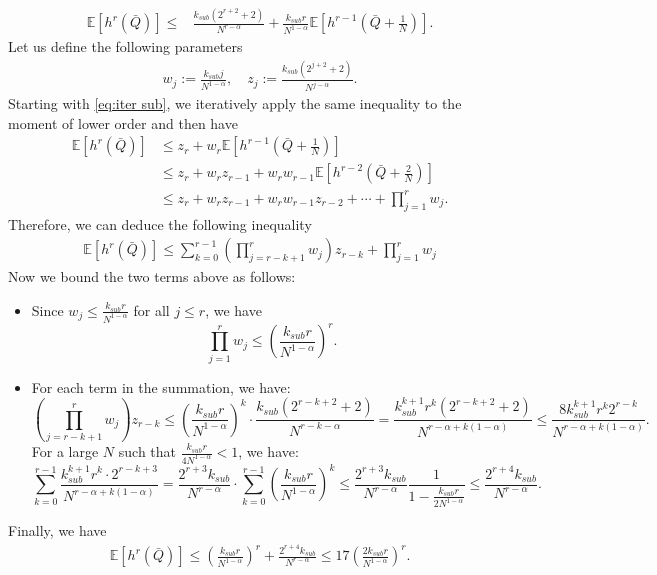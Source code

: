 \documentclass[11pt,oneside,letter]{article}
\begin{document}
\begin{align}
\mathbb{E} \left[ h^r(\bar{Q}) \right]
\leq & \frac{k_{sub} (2^{r+2}+2)}{ N^{r - \alpha} }
+ \frac{k_{sub} r}{ N^{1-\alpha} } \mathbb{E} \left[ h^{r-1} \left( \bar{Q} + \frac{1}{N} \right) \right]. \label{eq:iter sub}
\end{align}
Let us define the following parameters 
\begin{align*}
w_j := \frac{k_{sub} j}{N^{1-\alpha}}, \quad 
z_j := \frac{k_{sub} (2^{j+2}+2)}{N^{j-\alpha}}.
\end{align*}
Starting with \eqref{eq:iter sub}, we iteratively apply the same inequality to the moment of lower order and then have
\begin{align}
\mathbb{E}[h^r(\bar{Q})] 
&\leq z_r + w_r \mathbb{E}[h^{r-1}(\bar{Q} + \tfrac{1}{N})] \nonumber\\
&\leq z_r + w_r z_{r-1} + w_r w_{r-1} \mathbb{E}[h^{r-2}(\bar{Q} + \tfrac{2}{N})] \nonumber\\
&\leq z_r + w_r z_{r-1} + w_r w_{r-1} z_{r-2} + \cdots +  \prod_{j=1}^{r} w_j. \label{eq:rec_expand}
\end{align}
Therefore, we can deduce the following inequality 
\begin{align}
\mathbb{E}[h^r(\bar{Q})] 
\leq \sum_{k=0}^{r-1} \left( \prod_{j=r-k+1}^{r} w_j \right) z_{r-k} + \prod_{j=1}^{r} w_j \label{eq:moment_bound_sum}
\end{align}
Now we bound the two terms above as follows: 
\begin{itemize}[leftmargin=*]
    \item Since $w_j \leq \frac{k_{sub} r}{N^{1-\alpha}}$ for all $j \leq r$, we have
    \[
    \prod_{j=1}^{r} w_j \leq \left( \frac{k_{sub} r}{N^{1-\alpha}} \right)^r. 
    \]
    \item 
    For each term in the summation, we have:
\[
\left( \prod_{j=r-k+1}^{r} w_j \right) z_{r-k} 
\leq \left( \frac{k_{sub} r}{N^{1-\alpha}} \right)^k \cdot \frac{k_{sub} (2^{r-k+2}+2)}{N^{r-k - \alpha}} 
= \frac{k_{sub}^{k+1} r^k(2^{r-k+2}+2)}{N^{r - \alpha + k(1 - \alpha)}} \leq \frac{8k_{sub}^{k+1} r^k 2^{r-k}}{N^{r - \alpha + k(1 - \alpha)}}.
\]
For a large $N$ such that $\frac{k_{sub} r}{4N^{1-\alpha}} < 1$, we have:
\[
\sum_{k=0}^{r-1} \frac{k_{sub}^{k+1} r^k \cdot 2^{r-k+3}}{N^{r-\alpha + k(1-\alpha)}} =  \frac{2^{r+3} k_{sub}}{N^{r-\alpha}} \cdot \sum_{k=0}^{r-1} \left(\frac{k_{sub} r}{N^{1-\alpha}}\right)^{k}
\leq \frac{2^{r+3} k_{sub}}{N^{r-\alpha}} \frac{1}{1 - \frac{k_{sub} r}{2 N^{1-\alpha}}} \leq \frac{ 2^{r+4} k_{sub}}{N^{r-\alpha}}.
\]
\end{itemize}
Finally, we have 
\begin{align}
\mathbb{E}[h^r(\bar{Q})] \leq \left( \frac{k_{sub} r}{N^{1-\alpha}} \right)^r +  \frac{ 2^{r+4} k_{sub}}{N^{r-\alpha}} \leq 17\left( \frac{ 2k_{sub} r}{N^{1-\alpha}} \right)^r.\label{eq:finalres sup} 
\end{align}
\end{document}
